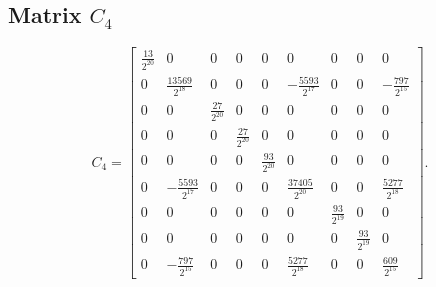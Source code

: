 \subsection{Matrix $C_4$}
\[C_4=\left[\begin{array}{ccccccccc}
\frac{13}{2^{20}} & 0 & 0 & 0 & 0 & 0 & 0 & 0 & 0\\
0 & \frac{13569}{2^{18}} & 0 & 0 & 0 & -\frac{5593}{2^{17}} & 0 & 0 & -\frac{797}{2^{15}}\\
0 & 0 & \frac{27}{2^{20}} & 0 & 0 & 0 & 0 & 0 & 0\\
0 & 0 & 0 & \frac{27}{2^{20}} & 0 & 0 & 0 & 0 & 0\\
0 & 0 & 0 & 0 & \frac{93}{2^{20}} & 0 & 0 & 0 & 0\\
0 & -\frac{5593}{2^{17}} & 0 & 0 & 0 & \frac{37405}{2^{20}} & 0 & 0 & \frac{5277}{2^{18}}\\
0 & 0 & 0 & 0 & 0 & 0 & \frac{93}{2^{19}} & 0 & 0\\
0 & 0 & 0 & 0 & 0 & 0 & 0 & \frac{93}{2^{19}} & 0\\
0 & -\frac{797}{2^{15}} & 0 & 0 & 0 & \frac{5277}{2^{18}} & 0 & 0 & \frac{609}{2^{15}}
\end{array}\right].\]
